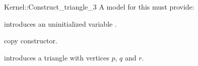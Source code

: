 \begin{ccRefFunctionObjectConcept}{Kernel::Construct_triangle_3}
A model for this must provide:



\ccHidden {}
             {introduces an uninitialized variable .}

\ccHidden {}
 	    {copy constructor.}

            {introduces a triangle  with vertices $p$, $q$ and $r$.}

\end{ccRefFunctionObjectConcept}
